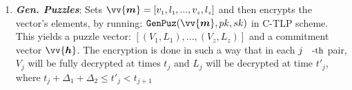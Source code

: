 \begin{enumerate}[leftmargin=.46cm]
\begin{enumerate}
\begin{enumerate}


\end{enumerate} 

\item\label{Gen-Puzzles-}\textbf{\textit{\small {Gen. Puzzles}}}: Sets $\vv{\bm{m}}=[v_{\scriptscriptstyle 1},l_{\scriptscriptstyle 1},...,v_{\scriptscriptstyle z},l_{\scriptscriptstyle z}]$  and then encrypts the vector's elements, by running: $\mathtt{GenPuz}(\vv{\bm{m}},pk,sk)$ in   C-TLP scheme. This yields a  puzzle vector: $[(V_{\scriptscriptstyle 1},L_{\scriptscriptstyle 1}),...,(V_{\scriptscriptstyle z},L_{\scriptscriptstyle z})]$ and a commitment vector $\vv{\bm{h}}$. The encryption is done in  such a way that in each $j\text{\small{-th}}$ pair, $V_{\scriptscriptstyle j}$ will be fully decrypted at times $t_{\scriptscriptstyle j}$ and $L_{\scriptscriptstyle j}$ will be decrypted at time $t'_{\scriptscriptstyle j}$, where  $ t_{\scriptscriptstyle j}+\Delta_{\scriptscriptstyle 1}+\Delta_{\scriptscriptstyle 2}\leq t'_{\scriptscriptstyle j} < t_{\scriptscriptstyle j+1}$  %






\end{enumerate}
\end{enumerate}
